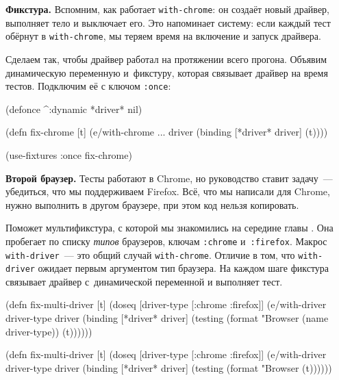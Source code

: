 
\textbf{Фикстура.} Вспомним, как работает \texttt{with\--chrome}: он создаёт новый
драйвер, выполняет тело и выключает его. Это напоминает систему: если каждый
тест обёрнут в \verb|with-chrome|, мы теряем время на включение и запуск
драйвера.

Сделаем так, чтобы драйвер работал на протяжении всего прогона. Объявим
динамическую переменную и~фикстуру, которая связывает драйвер на время
тестов. Подключим её с ключом \verb|:once|:

\begin{english}
  \begin{clojure}
(defonce ^:dynamic *driver* nil)

(defn fix-chrome [t]
  (e/with-chrome {...} driver
    (binding [*driver* driver]
      (t))))

(use-fixtures :once fix-chrome)
  \end{clojure}
\end{english}

\textbf{Второй браузер.} Тесты работают в Chro\-me, но руководство ставит
задачу~--- убедиться, что мы поддерживаем Firefox. Всё, что мы написали для
Chrome, нужно выполнить в другом браузере, при этом код нельзя копировать.

Поможет мультификстура, с которой мы знакомились на середине
главы . Она пробегает по списку \emph{типов} браузеров,
ключам \verb|:chrome| и~\verb|:firefox|. Макрос \verb|with-driver|~--- это общий
случай \verb|with-chrome|. Отличие в том, что \verb|with-driver| ожидает первым
аргументом тип браузера. На каждом шаге фикстура связывает драйвер
с~динамической переменной и выполняет тест.

\ifx\DEVICETYPE\MOBILE

\begin{english}
  \begin{clojure}
(defn fix-multi-driver [t]
  (doseq [driver-type [:chrome :firefox]]
    (e/with-driver driver-type {} driver
      (binding [*driver* driver]
        (testing (format "Browser %
                   (name driver-type))
          (t))))))
  \end{clojure}
\end{english}

\else

\begin{english}
  \begin{clojure}
(defn fix-multi-driver [t]
  (doseq [driver-type [:chrome :firefox]]
    (e/with-driver driver-type {} driver
      (binding [*driver* driver]
        (testing (format "Browser %
          (t))))))
  \end{clojure}
\end{english}


